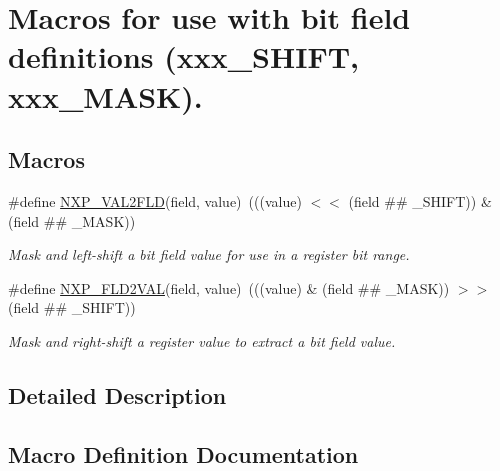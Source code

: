 \hypertarget{group___bit___field___generic___macros}{}\section{Macros for use with bit field definitions (xxx\+\_\+\+S\+H\+I\+FT, xxx\+\_\+\+M\+A\+SK).}
\label{group___bit___field___generic___macros}
\subsection*{Macros}
\begin{DoxyCompactItemize}
\item 
\#define \mbox{\hyperlink{group___bit___field___generic___macros_ga174e73af51fd6bf7974359c28ec60c0d}{N\+X\+P\+\_\+\+V\+A\+L2\+F\+LD}}(field,  value)~(((value) $<$$<$ (field \#\# \+\_\+\+S\+H\+I\+FT)) \& (field \#\# \+\_\+\+M\+A\+SK))
\begin{DoxyCompactList}\small\item\em Mask and left-\/shift a bit field value for use in a register bit range. \end{DoxyCompactList}\item 
\#define \mbox{\hyperlink{group___bit___field___generic___macros_ga83e253adbbe07eccc440659bf67ef176}{N\+X\+P\+\_\+\+F\+L\+D2\+V\+AL}}(field,  value)~(((value) \& (field \#\# \+\_\+\+M\+A\+SK)) $>$$>$ (field \#\# \+\_\+\+S\+H\+I\+FT))
\begin{DoxyCompactList}\small\item\em Mask and right-\/shift a register value to extract a bit field value. \end{DoxyCompactList}\end{DoxyCompactItemize}


\subsection{Detailed Description}


\subsection{Macro Definition Documentation}
\mbox{\label{group___bit___field___generic___macros_ga83e253adbbe07eccc440659bf67ef176}} 
